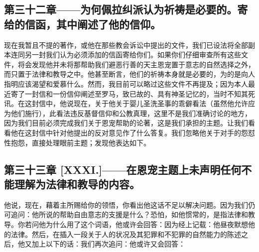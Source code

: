 
\subsection{第三十二章——为何佩拉纠派认为祈祷是必要的。寄给的信函，其中阐述了他的信仰。}

现在我暂且不提的著作，或他在那些教会诉讼中提出的文件，我们已设法将全部副本连同另一封我们认为必须添加的信函寄给你们。如果你们仔细审查所有这些文件，将会发现他并未将那帮助我们避恶行善的天主恩宠置于意志的自然选择之外，而只置于法律和教导之中。他甚至断言，他们的祈祷本身就是必要的，为的是向人指明应该渴望和爱慕什么。然而，我目前可以略过这些文件不再提及；因为本人最近寄了一封信和一份信仰阐述至罗马，致已故的、具有神圣记忆的，当时不知其死讯。在这封信中，他说现在，关于他关于婴儿圣洗圣事的乖僻看法（虽然他允许应为他们施行），此看法违反基督信仰和公教真理，这里不是我们准确讨论的地方，因为我们目前必须完成我们关于恩宠帮助的论著，这是我们承担的主题。让我们看看他在这封信中针对他提出的反对意见作了什么答复。我们忽略他关于对手的怨怼性抱怨，直接处理眼前主题；发现他表达如下。\par


\subsection{第三十三章 [XXXI.]——在恩宠主题上未声明任何不能理解为法律和教导的内容。}

他说，现在，藉着主所赐给你的领悟，你看出他这话不足以解决问题。因为我们仍可追问：他所说的帮助自由意志的支援是什么？恐怕，如他惯常的，是指法律和教导。你若问他为什么用了这个词语，他或许会回答：因为经上记载：他昼夜默想他的法律。然后，在插入一段关于人的状况及其犯罪和不犯罪的自然能力的陈述之后，他又加上以下的话：我们再次追问：他或许又会回答：\par

